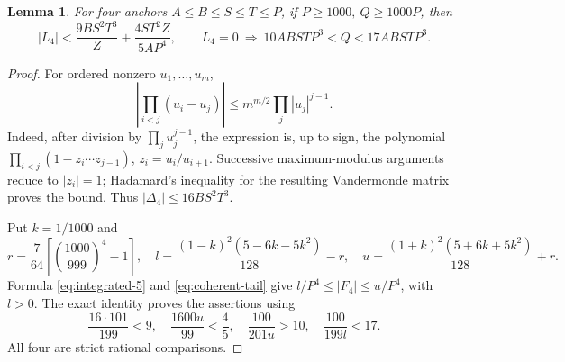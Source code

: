 \documentclass[12pt]{article}
\newtheorem{lemma}[theorem]{Lemma}
\numberwithin{equation}{section}
\begin{document}
\begin{lemma}\label{lem:direct-four}
For four anchors \(A\le B\le S\le T\le P\), if
\(P\ge1000,\ Q\ge1000P\), then
\[
 |L_4|<\frac{9BS^2T^3}{Z}+\frac{4ST^2Z}{5AP^4},\qquad
 L_4=0\ \Longrightarrow\ 10ABSTP^3<Q<17ABSTP^3.
\]
\end{lemma}
\begin{proof}
For ordered nonzero \(u_1,\ldots,u_m\),
\[
 \left|\prod_{i<j}(u_i-u_j)\right|
 \le m^{m/2}\prod_j|u_j|^{j-1}.
\]
Indeed, after division by \(\prod_j u_j^{j-1}\), the expression is,
up to sign, the polynomial
\(\prod_{i<j}(1-z_i\cdots z_{j-1})\), \(z_i=u_i/u_{i+1}\).
Successive maximum-modulus arguments reduce to \(|z_i|=1\);
Hadamard's inequality for the resulting Vandermonde matrix proves the bound.
Thus \(|\Delta_4|\le16BS^2T^3\).

Put \(k=1/1000\) and
\[
 r=\frac7{64}\left[\left(\frac{1000}{999}\right)^4-1\right],\quad
 l=\frac{(1-k)^2(5-6k-5k^2)}{128}-r,\quad
 u=\frac{(1+k)^2(5+6k+5k^2)}{128}+r.
\]
Formula \eqref{eq:integrated-5} and \eqref{eq:coherent-tail} give
\(l/P^4\le|F_4|\le u/P^4\), with \(l>0\).
The exact identity proves the assertions using
\[
 \frac{16\cdot101}{199}<9,\quad
 \frac{1600u}{99}<\frac45,\quad
 \frac{100}{201u}>10,\quad \frac{100}{199l}<17.
\]
All four are strict rational comparisons.
\end{proof}
\end{document}
